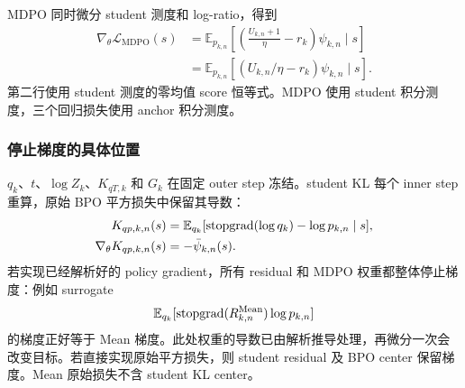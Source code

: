 MDPO 同时微分 student 测度和 log-ratio，得到
\begin{align}
\nabla_\theta\mathcal L_{\mathrm{MDPO}}(s)
&=\mathbb E_{p_{k,n}}\left[\left(\frac{U_{k,n}+1}\eta-r_k\right)\psi_{k,n}\mid s\right]\\
&=\mathbb E_{p_{k,n}}[(U_{k,n}/\eta-r_k)\psi_{k,n}\mid s].
\end{align}
第二行使用 student 测度的零均值 score 恒等式。MDPO 使用 student 积分测度，三个回归损失使用 anchor 积分测度。

\subsubsection*{停止梯度的具体位置}
$q_k$、$t$、$\log Z_k$、$K_{qT,k}$ 和 $G_k$ 在固定 outer step 冻结。student KL 每个 inner step 重算，原始 BPO 平方损失中保留其导数：
\begin{align}
K_{qp,k,n}(s)&=\mathbb E_{q_k}[\operatorname{stopgrad}(\log q_k)-\log p_{k,n}\mid s],\\
\nabla_\theta K_{qp,k,n}(s)&=-\bar\psi_{k,n}(s).
\label{eq:ch2-opd-grad-ktheta}
\end{align}
若实现已经解析好的 policy gradient，所有 residual 和 MDPO 权重都整体停止梯度：例如 surrogate
\begin{equation}
\mathbb E_{q_k}[\operatorname{stopgrad}(R_{k,n}^{\mathrm{Mean}})\log p_{k,n}]
\end{equation}
的梯度正好等于 Mean 梯度。此处权重的导数已由解析推导处理，再微分一次会改变目标。若直接实现原始平方损失，则 student residual 及 BPO center 保留梯度。Mean 原始损失不含 student KL center。
